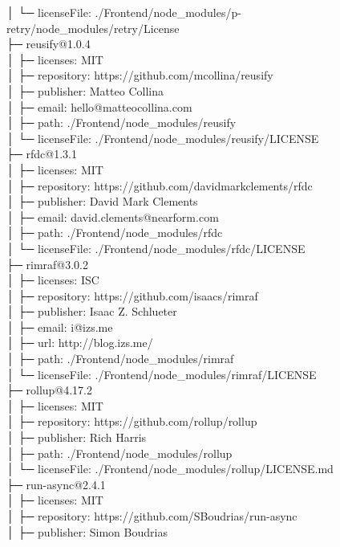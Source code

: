 │  └─ licenseFile: ./Frontend/node\_modules/p-retry/node\_modules/retry/License\\
├─ reusify@1.0.4\\
│  ├─ licenses: MIT\\
│  ├─ repository: https://github.com/mcollina/reusify\\
│  ├─ publisher: Matteo Collina\\
│  ├─ email: hello@matteocollina.com\\
│  ├─ path: ./Frontend/node\_modules/reusify\\
│  └─ licenseFile: ./Frontend/node\_modules/reusify/LICENSE\\
├─ rfdc@1.3.1\\
│  ├─ licenses: MIT\\
│  ├─ repository: https://github.com/davidmarkclements/rfdc\\
│  ├─ publisher: David Mark Clements\\
│  ├─ email: david.clements@nearform.com\\
│  ├─ path: ./Frontend/node\_modules/rfdc\\
│  └─ licenseFile: ./Frontend/node\_modules/rfdc/LICENSE\\
├─ rimraf@3.0.2\\
│  ├─ licenses: ISC\\
│  ├─ repository: https://github.com/isaacs/rimraf\\
│  ├─ publisher: Isaac Z. Schlueter\\
│  ├─ email: i@izs.me\\
│  ├─ url: http://blog.izs.me/\\
│  ├─ path: ./Frontend/node\_modules/rimraf\\
│  └─ licenseFile: ./Frontend/node\_modules/rimraf/LICENSE\\
├─ rollup@4.17.2\\
│  ├─ licenses: MIT\\
│  ├─ repository: https://github.com/rollup/rollup\\
│  ├─ publisher: Rich Harris\\
│  ├─ path: ./Frontend/node\_modules/rollup\\
│  └─ licenseFile: ./Frontend/node\_modules/rollup/LICENSE.md\\
├─ run-async@2.4.1\\
│  ├─ licenses: MIT\\
│  ├─ repository: https://github.com/SBoudrias/run-async\\
│  ├─ publisher: Simon Boudrias\\

